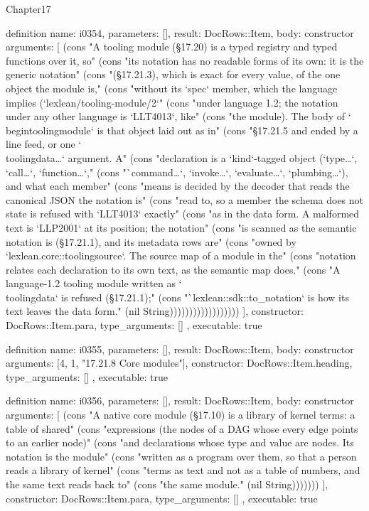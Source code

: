 \begin{lexlean}{Chapter17}
\begin{semanticmodule}
definition{
  name: i0354,
  parameters: [],
  result: DocRows::Item,
  body: constructor{
    arguments: [
      (cons "A tooling module (§17.20) is a typed registry and typed functions over it, so" (cons "its notation has no readable forms of its own: it is the generic notation" (cons "(§17.21.3), which is exact for every value, of the one object the module is," (cons "without its `spec` member, which the language implies (`lexlean/tooling-module/2`" (cons "under language 1.2; the notation under any other language is `LLT4013`, like" (cons "the module). The body of `\\begin{toolingmodule}` is that object laid out as in" (cons "§17.21.5 and ended by a line feed, or one `\\toolingdata{…}` argument. A" (cons "declaration is a `kind`-tagged object (`type{…}`, `call{…}`, `function{…}`," (cons "`command{…}`, `invoke{…}`, `evaluate{…}`, `plumbing{…}`), and what each member" (cons "means is decided by the decoder that reads the canonical JSON the notation is" (cons "read to, so a member the schema does not state is refused with `LLT4013` exactly" (cons "as in the data form. A malformed text is `LLP2001` at its position; the notation" (cons "is scanned as the semantic notation is (§17.21.1), and its metadata rows are" (cons "owned by `lexlean.core::toolingsource`. The source map of a module in the" (cons "notation relates each declaration to its own text, as the semantic map does." (cons "A language-1.2 tooling module written as `\\toolingdata` is refused (§17.21.1);" (cons "`lexlean::sdk::to_notation` is how its text leaves the data form." (nil String))))))))))))))))))
    ],
    constructor: DocRows::Item.para,
    type_arguments: []
  },
  executable: true
}

definition{
  name: i0355,
  parameters: [],
  result: DocRows::Item,
  body: constructor{
    arguments: [4, 1, "17.21.8 Core modules"],
    constructor: DocRows::Item.heading,
    type_arguments: []
  },
  executable: true
}

definition{
  name: i0356,
  parameters: [],
  result: DocRows::Item,
  body: constructor{
    arguments: [
      (cons "A native core module (§17.10) is a library of kernel terms: a table of shared" (cons "expressions (the nodes of a DAG whose every edge points to an earlier node)" (cons "and declarations whose type and value are nodes. Its notation is the module" (cons "written as a program over them, so that a person reads a library of kernel" (cons "terms as text and not as a table of numbers, and the same text reads back to" (cons "the same module." (nil String)))))))
    ],
    constructor: DocRows::Item.para,
    type_arguments: []
  },
  executable: true
}


\end{semanticmodule}
\end{lexlean}
